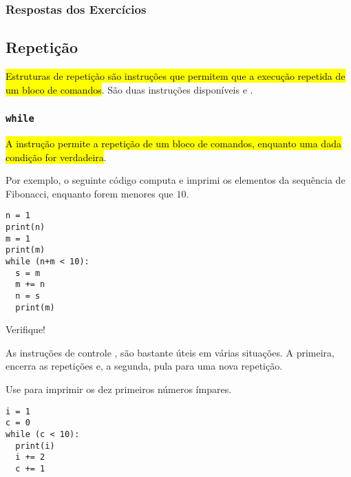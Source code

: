 \ifisbook 
\subsubsection*{Respostas dos Exercícios}
\shipoutAnswer
\fi

\subsection{Repetição}

\hl{Estruturas de repetição são instruções que permitem que a execução repetida de um bloco de comandos}. São duas instruções disponíveis {\PYTHONwhile} e {\PYTHONfor}.

\subsubsection{\texttt{while}}

\hl{A instrução {\PYTHONwhile} permite a repetição de um bloco de comandos, enquanto uma dada condição for verdadeira}. 

Por exemplo, o seguinte código computa e imprimi os elementos da sequência de Fibonacci{\fibonacci}, enquanto forem menores que $10$.

\begin{lstlisting}
n = 1
print(n)
m = 1
print(m)
while (n+m < 10):
  s = m
  m += n
  n = s
  print(m)
\end{lstlisting}

Verifique!

\begin{obs}
  As instruções de controle {\PYTHONbreak}, {\PYTHONcontinue} são bastante úteis em várias situações. A primeira, encerra as repetições e, a segunda, pula para uma nova repetição.
\end{obs}

\begin{exer}
  Use {\PYTHONwhile} para imprimir os dez primeiros números ímpares.
\end{exer}
\begin{resp}
  
\begin{lstlisting}
i = 1
c = 0
while (c < 10):
  print(i)
  i += 2
  c += 1
\end{lstlisting}

\end{resp}

